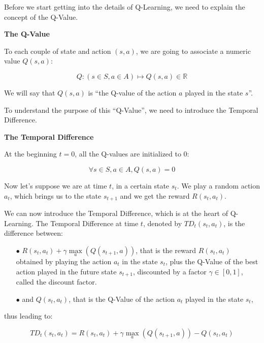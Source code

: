 \documentclass[]{book}
\begin{document}
Before we start getting into the details of Q-Learning, we need to explain the concept of the Q-Value.

\textbf{The Q-Value}

To each couple of state and action \((s,a)\), we are going to associate a numeric value \(Q(s,a)\):

\begin{equation*}
Q: (s \in S, a \in A) \mapsto Q(s,a) \in \mathbb{R}
\end{equation*}

We will say that \(Q(s,a)\) is ``the Q-value of the action \(a\) played in the state \(s\)''.

To understand the purpose of this ``Q-Value'', we need to introduce the Temporal Difference.

\textbf{The Temporal Difference}

At the beginning \(t=0\), all the Q-values are initialized to 0:

\begin{equation*}
\forall s \in S, a \in A, Q(s,a) = 0
\end{equation*}

Now let's suppose we are at time \(t\), in a certain state \(s_t\). We play a random action \(a_t\), which brings us to the state \(s_{t+1}\) and we get the reward \(R(s_t,a_t)\).

We can now introduce the Temporal Difference, which is at the heart of Q-Learning. The Temporal Difference at time \(t\), denoted by \(TD_t(s_t,a_t)\), is the difference between:

\begin{itemize}

\item[$\bullet$] $R(s_t,a_t) + \gamma \underset{a}{\max}(Q(s_{t+1},a))$, that is the reward $R(s_t,a_t)$ obtained by playing the action $a_t$ in the state $s_t$, plus the Q-Value of the best action played in the future state $s_{t+1}$, discounted by a factor $\gamma \in [0,1]$, called the discount factor.

\item[$\bullet$] and $Q(s_t, a_t)$, that is the Q-Value of the action $a_t$ played in the state $s_t$,

\end{itemize}

thus leading to:

\begin{equation*}
TD_t(s_t,a_t) = R(s_t,a_t) + \gamma \underset{a}{\max}(Q(s_{t+1},a)) - Q(s_t,a_t)
\end{equation*}
\end{document}
